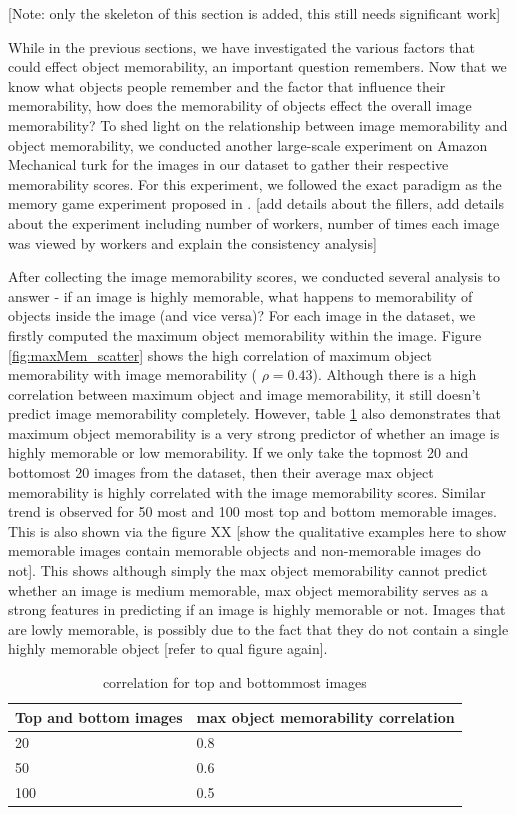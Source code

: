[Note: only the skeleton of this section is added, this still needs significant work]

While in the previous sections, we have investigated the various factors that could effect object memorability, an important question remembers. Now that we know what objects people remember and the factor that influence their memorability, how does the memorability of objects effect the overall image memorability? To shed light on the relationship between image memorability and object memorability, we conducted another large-scale experiment on Amazon Mechanical turk for the images in our dataset to gather their respective memorability scores. For this experiment, we followed the exact paradigm as the memory game experiment proposed in \cite{isola11}. [add details about the fillers, add details about the experiment including number of workers, number of times each image was viewed by workers and explain the consistency analysis]

After collecting the image memorability scores, we conducted several analysis to answer - if an image is highly memorable, what happens to memorability of objects inside the image (and vice versa)? For each image in the dataset, we firstly computed the maximum object memorability within the image. Figure \ref{fig:maxMem_scatter} shows the high correlation of maximum object memorability with image memorability ( $\rho = 0.43$). Although there is a high correlation between maximum object and image memorability, it still doesn't predict image memorability completely. However, table \ref{tab:imMem} also demonstrates that maximum object memorability is a very strong predictor of whether an image is highly memorable or low memorability. If we only take the topmost 20 and bottomost 20 images from the dataset, then their average max object memorability is highly correlated with the image memorability scores. Similar trend is observed for 50 most and 100 most top and bottom memorable images. This is also shown via the figure XX [show the qualitative examples here to show memorable images contain memorable objects and non-memorable images do not]. This shows although simply the max object memorability cannot predict whether an image is medium memorable, max object memorability serves as a strong features in predicting if an image is highly memorable or not. Images that are lowly memorable, is possibly due to the fact that they do not contain a single highly memorable object [refer to qual figure again]. 

\begin{table}[h]
\begin{center}
    \begin{tabular}{| l | l |}
    \hline
    Top and bottom images & max object memorability correlation \\ \hline
    20 & 0.8  \\ \hline
    50 & 0.6  \\ \hline
    100 & 0.5  \\ \hline    
    \end{tabular}
\end{center}
\caption {correlation for top and bottommost images} \label{tab:imMem}
\end{table}


